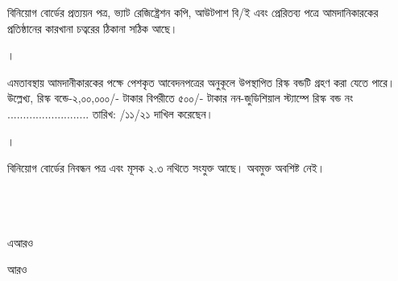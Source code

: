 \documentclass[12pt]{article}
\newcommand{\frbdt}{তারিখ: \hspace{2.4em} /১১/২১}
\begin{document}
\begin{minipage}[t]{0.96\linewidth}
বিনিয়োগ বোর্ডের প্রত্যয়ন পত্র,
ভ্যাট রেজিষ্ট্রেশন কপি,
আউটপাশ বি/ই এবং প্রেরিতব্য পত্রে
আমদানিকারকের প্রতিষ্ঠানের কারখানা চত্বরের
ঠিকানা সঠিক আছে।
\\
\end{minipage}
\begin{minipage}[t]{0.04\linewidth}
।
\end{minipage}
\begin{minipage}[t]{0.96\linewidth}
এমতাবস্থায় আমদানীকারকের পক্ষে
পেশকৃত আবেদনপত্রের অনুকূলে
উপস্থাপিত রিস্ক বন্ডটি গ্রহণ করা যেতে পারে।
উল্লেখ্য, রিস্ক বন্ডে-২,০০,০০০/- টাকার
বিপরীতে ৫০০/- টাকার নন-জুডিশিয়াল
স্ট্যাম্পে রিস্ক বন্ড নং ..........................
{\frbdt} দাখিল করেছেন।
\\
\end{minipage}
\begin{minipage}[t]{0.04\linewidth}
।
\end{minipage}
\begin{minipage}[t]{0.96\linewidth}
বিনিয়োগ বোর্ডের নিবন্ধন পত্র এবং
মূসক ২.৩ নথিতে সংযুক্ত আছে।
অবমুক্ত অবশিষ্ট নেই।
\\
\\
\\
\\
\end{minipage}
\normalsize
\begin{minipage}[t]{0.6\linewidth}
\hspace{1em}
\end{minipage}
\begin{minipage}[t]{0.2\linewidth}
এআরও
\end{minipage}
\begin{minipage}[t]{0.2\linewidth}
আরও
\end{minipage}
\thispagestyle{laststyle}
\end{document}
